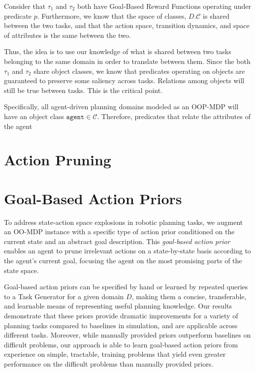 \documentclass[11pt]{article}
\begin{document}
Consider that $\tau_1$ and $\tau_2$ both have Goal-Based Reward Functions operating under predicate $p$. Furthermore, we know that the space of classes, $D.\mathcal{C}$ is shared between the two tasks, and that the action space, transition dynamics, and space of attributes is the same between the two.

Thus, the idea is to use our knowledge of what is shared between two tasks belonging to the same domain in order to translate between them. Since the both $\tau_1$ and $\tau_2$ share object classes, we know that predicates operating on objects are guaranteed to preserve some saliency across tasks. Relations among objects will still be true between tasks. This is the critical point.

Specifically, all agent-driven planning domains modeled as an OOP-MDP will have an object class $\texttt{agent} \in \mathcal{C}$. Therefore, predicates that relate the attributes of the agent 

\section{Action Pruning}
\label{sec:action_pruning}


\section{Goal-Based Action Priors}
\label{sec:gbaps}

To address state-action space explosions in robotic planning tasks,
we augment an OO-MDP instance with a
specific type of action prior conditioned on the current state and an abstract goal description. This {\it goal-based action prior}
enables an agent to prune irrelevant actions on a
state-by-state basis according to the agent's current goal, focusing the agent on
the most promising parts of the state space.  
 
Goal-based action priors can be specified
by hand or learned by repeated queries to a Task Generator for a given domain $D$, making them a concise, transferable, and learnable means of
representing useful planning knowledge. Our results demonstrate
that these priors provide dramatic improvements for a variety of
planning tasks compared to baselines in simulation, and are applicable
across different tasks.  Moreover, while manually provided
priors outperform baselines on difficult problems, our approach
is able to learn goal-based action priors from experience on simple, tractable, 
training problems that yield even greater performance on the difficult problems
than manually provided priors.
\end{document}
